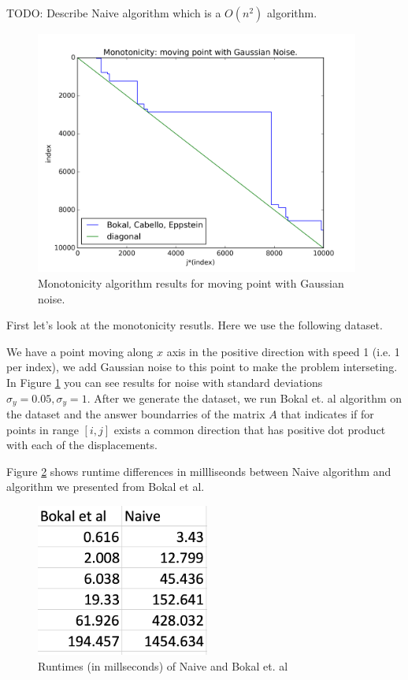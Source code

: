 \documentclass{article}
\begin{document}
TODO: Describe Naive algorithm which is a $O(n^2)$ algorithm.

\begin{figure}[!ht]
  \centering
  \includegraphics[height=8cm]{../plots/monotonicity_moving_gaussian}
  \caption{Monotonicity algorithm results for moving point with Gaussian noise.}
  \label{fig:monotonicity_demo}
\end{figure}

First let's look at the monotonicity resutls. Here we use the following dataset.

We have a point moving along $x$ axis in the positive direction with speed 1 (i.e. 1 per index), we add Gaussian noise to this point to make the problem interseting. In Figure \ref{fig:monotonicity_demo} you can see results for noise with standard deviations $\sigma_y = 0.05, \sigma_y = 1$. After we generate the dataset, we run Bokal et. al algorithm on the dataset and the answer boundarries of the matrix $A$ that indicates if for points in range $[i, j]$ exists a common direction that has positive dot product with each of the displacements.

Figure \ref{fig:monotonicity_comparison} shows runtime differences in millliseonds between Naive algorithm and algorithm we presented from Bokal et al.
\begin{figure}[!ht]
  \centering
  \includegraphics[height=5cm]{../plots/monotonicity_comparison}
  \caption{Runtimes (in millseconds) of Naive and Bokal et. al}
  \label{fig:monotonicity_comparison}
\end{figure}
\end{document}

